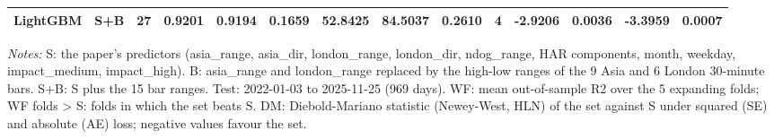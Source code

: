 \begin{table}[htbp]
{\begin{tabular}{llrrrrrrrrrrrr}
LightGBM & S+B & 27 & 0.9201 & 0.9194 & 0.1659 & 52.8425 & 84.5037 & 0.2610 & 4 & -2.9206 & 0.0036 & -3.3959 & 0.0007 \\
\bottomrule
\end{tabular}%
}
\par\vspace{2pt}\footnotesize\textit{Notes:} S: the paper's predictors (asia\_range, asia\_dir, london\_range, london\_dir, ndog\_range, HAR components, month, weekday, impact\_medium, impact\_high). B: asia\_range and london\_range replaced by the high-low ranges of the 9 Asia and 6 London 30-minute bars. S+B: S plus the 15 bar ranges. Test: 2022-01-03 to 2025-11-25 (969 days). WF: mean out-of-sample R2 over the 5 expanding folds; WF folds > S: folds in which the set beats S. DM: Diebold-Mariano statistic (Newey-West, HLN) of the set against S under squared (SE) and absolute (AE) loss; negative values favour the set.
\end{table}
